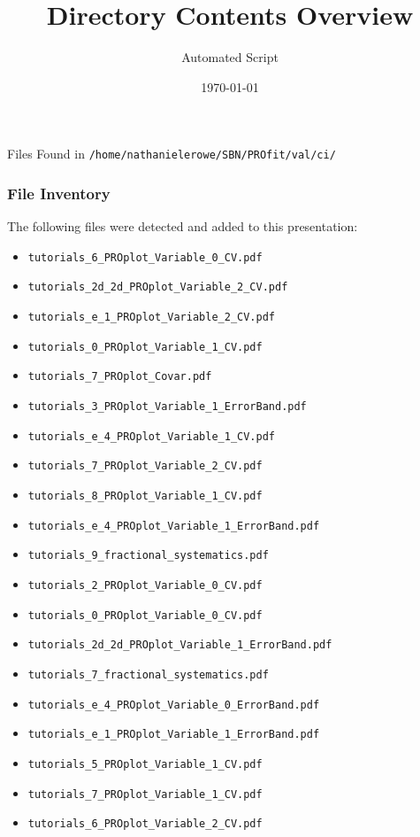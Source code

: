 \documentclass{beamer}
\title{Directory Contents Overview}
\author{Automated Script}
\date{\today}
\begin{document}
\begin{frame}
  \titlepage
\end{frame}

\begin{frame}{Files Found in \texttt{/home/nathanielerowe/SBN/PROfit/val/ci/}}
  \frametitle{File Inventory}
  The following files were detected and added to this presentation:
  \begin{itemize}
    \item \texttt{tutorials\_6\_PROplot\_Variable\_0\_CV.pdf}
    \item \texttt{tutorials\_2d\_2d\_PROplot\_Variable\_2\_CV.pdf}
    \item \texttt{tutorials\_e\_1\_PROplot\_Variable\_2\_CV.pdf}
    \item \texttt{tutorials\_0\_PROplot\_Variable\_1\_CV.pdf}
    \item \texttt{tutorials\_7\_PROplot\_Covar.pdf}
    \item \texttt{tutorials\_3\_PROplot\_Variable\_1\_ErrorBand.pdf}
    \item \texttt{tutorials\_e\_4\_PROplot\_Variable\_1\_CV.pdf}
    \item \texttt{tutorials\_7\_PROplot\_Variable\_2\_CV.pdf}
    \item \texttt{tutorials\_8\_PROplot\_Variable\_1\_CV.pdf}
    \item \texttt{tutorials\_e\_4\_PROplot\_Variable\_1\_ErrorBand.pdf}
    \item \texttt{tutorials\_9\_fractional\_systematics.pdf}
    \item \texttt{tutorials\_2\_PROplot\_Variable\_0\_CV.pdf}
    \item \texttt{tutorials\_0\_PROplot\_Variable\_0\_CV.pdf}
    \item \texttt{tutorials\_2d\_2d\_PROplot\_Variable\_1\_ErrorBand.pdf}
    \item \texttt{tutorials\_7\_fractional\_systematics.pdf}
    \item \texttt{tutorials\_e\_4\_PROplot\_Variable\_0\_ErrorBand.pdf}
    \item \texttt{tutorials\_e\_1\_PROplot\_Variable\_1\_ErrorBand.pdf}
    \item \texttt{tutorials\_5\_PROplot\_Variable\_1\_CV.pdf}
    \item \texttt{tutorials\_7\_PROplot\_Variable\_1\_CV.pdf}
    \item \texttt{tutorials\_6\_PROplot\_Variable\_2\_CV.pdf}

\end{itemize}
\end{frame}
\end{document}
